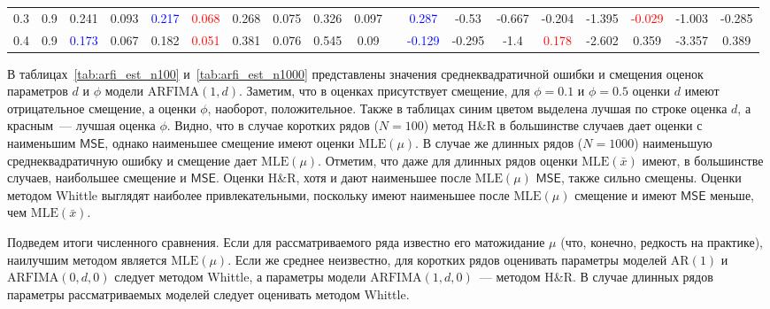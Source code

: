 \documentclass[specialist,
substylefile = spbu_report.rtx,
subf,12pt]{disser}
\theoremstyle{definition}
\begin{document}
\begin{table}
{\begin{tabular}{m{1cm}m{1cm}ccccccccm{0.2cm}cccccccc}
			0.3 & 0.9    & 0.241                                        & 0.093                                      & \textcolor{blue}{0.217}                       & \textcolor{red}{0.068}      & 0.268                   & 0.075                                   & 0.326                                      & 0.097                    &                             & \textcolor{blue}{0.287}  & -0.53                  & -0.667                   & -0.204                 & -1.395   & \textcolor{red}{-0.029} & -1.003                   & -0.285                  \\
			0.4 & 0.9    & \textcolor{blue}{0.173}                      & 0.067                                      & 0.182                                         & \textcolor{red}{0.051}      & 0.381                   & 0.076                                   & 0.545                                      & 0.09                     &                             & \textcolor{blue}{-0.129} & -0.295                 & -1.4                     & \textcolor{red}{0.178} & -2.602   & 0.359                   & -3.357                   & 0.389                   \\
			\hline
		\end{tabular}
	}
\end{table}

В таблицах~\ref{tab:arfi_est_n100} и~\ref{tab:arfi_est_n1000} представлены значения среднеквадратичной ошибки и смещения оценок параметров $d$ и $\phi$ модели $\textrm{ARFIMA}(1, d)$. Заметим, что в оценках присутствует смещение, для $\phi=0.1$ и $\phi=0.5$ оценки $d$ имеют отрицательное смещение, а оценки $\phi$, наоборот, положительное. Также в таблицах синим цветом выделена лучшая по строке оценка $d$, а красным~--- лучшая оценка $\phi$. Видно, что в случае коротких рядов ($N=100$) метод H\&R в большинстве случаев дает оценки с наименьшим $\mathsf{MSE}$, однако наименьшее смещение имеют оценки $\mathrm{MLE}(\mu)$. В случае же длинных рядов ($N=1000$) наименьшую среднеквадратичную ошибку и смещение дает $\mathrm{MLE}(\mu)$. Отметим, что даже для длинных рядов оценки $\mathrm{MLE}(\bar x)$ имеют, в большинстве случаев, наибольшее смещение и $\mathsf{MSE}$. Оценки H\&R, хотя и дают наименьшее после $\mathrm{MLE}(\mu)$ $\mathsf{MSE}$, также сильно смещены. Оценки методом Whittle выглядят наиболее привлекательными, поскольку имеют наименьшее после $\mathrm{MLE}(\mu)$ смещение и имеют $\mathsf{MSE}$ меньше, чем $\mathrm{MLE}(\bar x)$.

Подведем итоги численного сравнения. Если для рассматриваемого ряда известно его матожидание $\mu$ (что, конечно, редкость на практике), наилучшим методом является $\mathrm{MLE}(\mu)$. Если же среднее неизвестно, для коротких рядов оценивать параметры моделей $\textrm{AR}(1)$ и $\textrm{ARFIMA}(0, d, 0)$ следует методом Whittle, а параметры модели $\textrm{ARFIMA}(1, d, 0)$~--- методом H\&R. В случае длинных рядов параметры рассматриваемых моделей следует оценивать методом Whittle.
\end{document}
